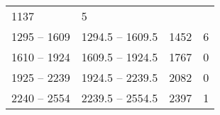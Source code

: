\documentclass[]{book}
\begin{document}
\begin{longtable}[]{@{}llll@{}}
\begin{minipage}[t]{0.14\columnwidth}
1137\strut
\end{minipage} & \begin{minipage}[t]{0.15\columnwidth}\raggedright
5\strut
\end{minipage}\tabularnewline
\begin{minipage}[t]{0.18\columnwidth}\raggedright
1295 -- 1609\strut
\end{minipage} & \begin{minipage}[t]{0.23\columnwidth}\raggedright
1294.5 -- 1609.5\strut
\end{minipage} & \begin{minipage}[t]{0.14\columnwidth}\raggedright
1452\strut
\end{minipage} & \begin{minipage}[t]{0.15\columnwidth}\raggedright
6\strut
\end{minipage}\tabularnewline
\begin{minipage}[t]{0.18\columnwidth}\raggedright
1610 -- 1924\strut
\end{minipage} & \begin{minipage}[t]{0.23\columnwidth}\raggedright
1609.5 -- 1924.5\strut
\end{minipage} & \begin{minipage}[t]{0.14\columnwidth}\raggedright
1767\strut
\end{minipage} & \begin{minipage}[t]{0.15\columnwidth}\raggedright
0\strut
\end{minipage}\tabularnewline
\begin{minipage}[t]{0.18\columnwidth}\raggedright
1925 -- 2239\strut
\end{minipage} & \begin{minipage}[t]{0.23\columnwidth}\raggedright
1924.5 -- 2239.5\strut
\end{minipage} & \begin{minipage}[t]{0.14\columnwidth}\raggedright
2082\strut
\end{minipage} & \begin{minipage}[t]{0.15\columnwidth}\raggedright
0\strut
\end{minipage}\tabularnewline
\begin{minipage}[t]{0.18\columnwidth}\raggedright
2240 -- 2554\strut
\end{minipage} & \begin{minipage}[t]{0.23\columnwidth}\raggedright
2239.5 -- 2554.5\strut
\end{minipage} & \begin{minipage}[t]{0.14\columnwidth}\raggedright
2397\strut
\end{minipage} & \begin{minipage}[t]{0.15\columnwidth}\raggedright
1\strut
\end{minipage}\tabularnewline
\bottomrule
\end{longtable}
\end{document}
